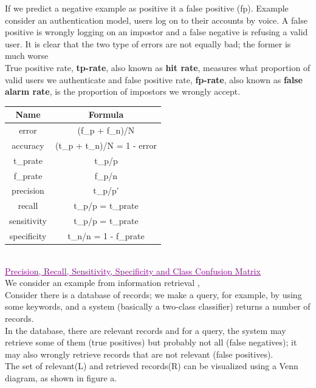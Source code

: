 If we predict a negative example as positive it a false positive (fp).
Example consider an authentication model, users log on to their accounts by voice. A false
positive is wrongly logging on an impostor and a false negative is refusing a valid user. It is
clear that the two type of errors are not equally bad; the former is much worse\\ [0.2cm]
True positive rate, \textbf{tp-rate}, also known as \textbf{hit rate}, measures what proportion of valid users we
authenticate and false positive rate, \textbf{fp-rate}, also known as \textbf{false alarm rate}, is the proportion
of impostors we wrongly accept. \\ 
\begin{center}
\begin{tabular}{|c|c|}
    \hline
    Name & Formula \\
    \hline
    error & (f_p + f_n)/N \\
    accuracy & (t_p + t_n)/N = 1 - error \\
    \hline
    t_prate & t_p/p \\
    f_prate & f_p/n \\
    \hline
    precision & t_p/p' \\
    recall & t_p/p = t_prate \\
    \hline
    sensitivity & t_p/p = t_prate \\
    specificity & t_n/n = 1 - f_prate \\
    \hline
\end{tabular}
\end{center}
\\
\textcolor{purple}{\underline{Precision, Recall, Sensitivity, Specificity and Class Confusion Matrix}} \\
 We consider an example from information retrieval ,\\[0.2cm]
Consider there is a database of records; we make a query, for example, by using some
keywords, and a system (basically a two-class classifier) returns a number of records.\\ [0.2cm]
In the database, there are relevant records and for a query, the system may retrieve some of
them (true positives) but probably not all (false negatives); it may also wrongly retrieve records
that are not relevant (false positives).\\[0.2cm]
The set of relevant(L) and retrieved records(R) can be visualized using a Venn diagram, as
shown in figure a. \\ 

